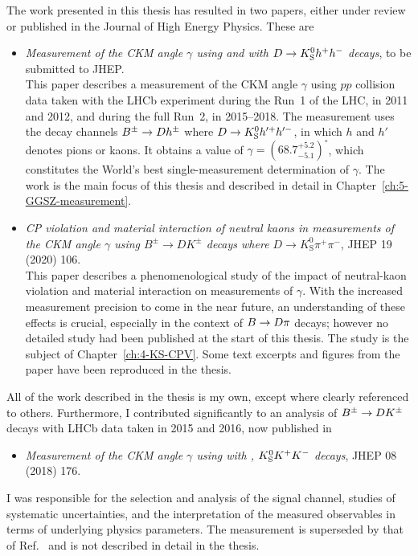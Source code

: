The work presented in this thesis has resulted in two papers, either under review or published in the Journal of High Energy Physics. These are
\begin{itemize}

    \item [] \cite{GGSZ-B2Dh} \emph{Measurement of the CKM angle $\gamma$ using \BtoDK and \BtoDpi with ${D}\rightarrow{\ensuremath{{K}^0_{\mathrm{S}}}} h^+ h^-$ decays}, to be submitted to JHEP. \\
    This paper describes a measurement of the CKM angle $\gamma$ using $pp$ collision data taken with the LHCb experiment during the Run~1 of the LHC, in 2011 and 2012, and during the full Run~2, in 2015--2018. The measurement uses the decay channels ${{B}^\pm}\rightarrow{\ensuremath{D}} h^\pm$ where ${D}\rightarrow{\ensuremath{{K}^0_{\mathrm{S}}}} h'^+h'^-$, in which $h$ and $h'$ denotes pions or kaons. It obtains a value of $\gamma= (68.7^{+5.2}_{-5.1})^\circ$, which constitutes the World's best single-measurement determination of $\gamma$. The work is the main focus of this thesis and described in detail in Chapter~\ref{ch:5-GGSZ-measurement}.

    \item [] \cite{KsCPV} \emph{CP violation and material interaction of neutral kaons
                        in measurements of the CKM angle $\gamma$ using $B^\pm\to
                        DK^\pm$ decays where $D\to K_\text{S}^0\pi^+\pi^-$}, JHEP 19 (2020) 106. \\
                        This paper describes a phenomenological study of the impact of neutral-kaon \CP violation and material interaction on measurements of $\gamma$. With the increased measurement precision to come in the near future, an understanding of these effects is crucial, especially in the context of ${B}\rightarrow{\ensuremath{D}}\pi$ decays; however no detailed study had been published at the start of this thesis. The study is the subject of Chapter~\ref{ch:4-KS-CPV}. Some text excerpts and figures from the paper have been reproduced in the thesis.
\end{itemize}
All of the work described in the thesis is my own, except where clearly referenced to others. Furthermore, I contributed significantly to an analysis of ${{B}^\pm}\rightarrow{\ensuremath{D}}{\ensuremath{{K}^\pm}}$ decays with LHCb data taken in 2015 and 2016, now published in
\begin{itemize}
    \item [] \cite{LHCb-PAPER-2018-017} \emph{Measurement of the CKM angle $\gamma$ using  with , ${{K}^0_{\mathrm{S}}} K^+K^-$ decays}, JHEP 08 (2018) 176.
\end{itemize}
I was responsible for the selection and analysis of the signal channel, studies of systematic uncertainties, and the interpretation of the measured observables in terms of underlying physics parameters. The measurement is superseded by that of Ref.~\cite{GGSZ-B2Dh} and is not described in detail in the thesis.

